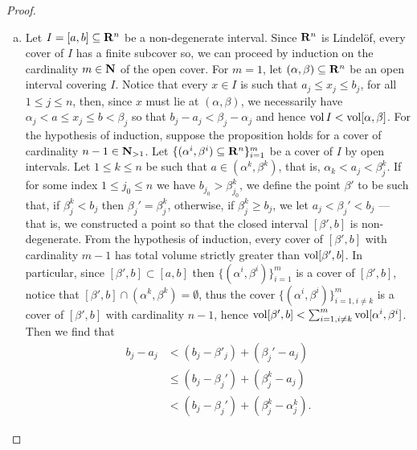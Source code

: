 \begin{proof}
\begin{enumerate}[(a)]
        \item Let \(I = [a, b] \subseteq \mathbf{R}^n\) be a non-degenerate interval. Since
              \(\mathbf{R}^n\) is Lindel\"{o}f, every cover of \(I\) has a finite subcover so, we can
              proceed by induction on the cardinality \(m \in \mathbf{N}\) of the open cover. For
              \(m = 1\), let \((\alpha, \beta) \subseteq \mathbf{R}^n\) be an open interval covering
              \(I\). Notice that every \(x \in I\) is such that \(a_j \leq x_j \leq b_j\),
              for all \(1 \leq j \leq n\), then, since \(x\) must lie at \((\alpha,
              \beta)\), we necessarily have \(\alpha_j < a \leq x_j \leq b < \beta_j\) so
              that \(b_j - a_j < \beta_j - \alpha_j\) and hence \(\operatorname{vol} I < \operatorname{vol} [\alpha,
                  \beta]\). For the hypothesis of induction, suppose the proposition holds for a
              cover of cardinality \(n - 1 \in \mathbf{N}_{> 1}\). Let \(\{(\alpha^{i},
              \beta^i) \subseteq \mathbf{R}^n\}_{i = 1}^m\) be a cover of \(I\) by open
              intervals. Let \(1 \leq k \leq n\) be such that \(a \in (\alpha^k, \beta^k)\),
              that is, \(\alpha_k < a_j < \beta_{j}^{k}\).  If for some index \(1 \leq j_0
              \leq n\) we have \(b_{j_0} > \beta_{j_0}^k\), we define the point \(\beta'\) to
              be such that, if \(\beta_j^k < b_j\) then \(\beta_j' = \beta_j^k\), otherwise,
              if \(\beta_j^k \geq b_j\), we let \(a_j < \beta_j' < b_j\) --- that is, we
              constructed a point so that the closed interval \([\beta', b]\) is
              non-degenerate. From the hypothesis of induction, every cover of \([\beta',
                      b]\) with cardinality \(m - 1\) has total volume strictly greater than \(\operatorname{vol}
              [\beta', b]\). In particular, since \([\beta', b] \subset [a, b]\) then
              \(\{(\alpha^i, \beta^i)\}_{i=1}^m\) is a cover of \([\beta', b]\), notice that
              \([\beta', b] \cap (\alpha^k, \beta^k) = \emptyset\), thus the cover
              \(\{(\alpha^{i}, \beta^i)\}_{i = 1, i \neq k}^m\) is a cover of \([\beta', b]\)
              with cardinality \(n - 1\), hence \(\operatorname{vol} [\beta', b] < \sum_{i=1, i \neq k}^m
              \operatorname{vol} [\alpha^i, \beta^i]\). Then we find that
              \begin{align*}
                  b_j - a_j
                   & < (b_j - \beta'_j) + (\beta_j' - a_j)          \\
                   & \leq (b_j - \beta_j') + (\beta_j^k - a_j)      \\
                   & < (b_j - \beta_j') + (\beta_j^k - \alpha_j^k).

\end{align*}
\end{enumerate}
\end{proof}
